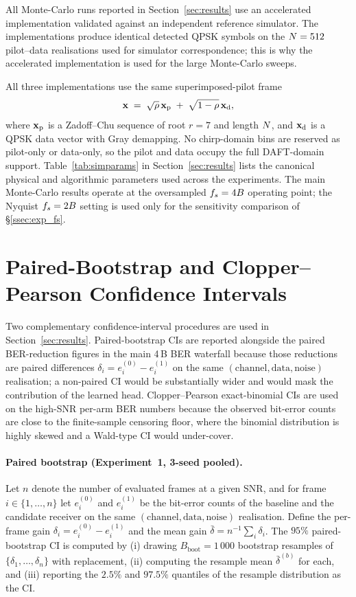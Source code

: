 All Monte-Carlo runs reported in Section~\ref{sec:results} use an
accelerated implementation validated against an independent reference
simulator. The implementations produce identical detected QPSK symbols
on the $N = 512$ pilot--data realisations used for simulator
correspondence; this is why the accelerated implementation is used for
the large Monte-Carlo sweeps.

All three implementations use the same superimposed-pilot frame
\begin{equation*}
\mathbf{x} \;=\; \sqrt{\rho}\,\mathbf{x}_{\mathrm{p}} \;+\; \sqrt{1 - \rho}\,\mathbf{x}_{\mathrm{d}},
\end{equation*}
where $\mathbf{x}_{\mathrm{p}}$ is a Zadoff--Chu sequence of root $r = 7$ and length $N$, and $\mathbf{x}_{\mathrm{d}}$ is a QPSK data vector with Gray demapping.
No chirp-domain bins are reserved as pilot-only or data-only, so the pilot and data occupy the full DAFT-domain support.
Table~\ref{tab:simparams} in Section~\ref{sec:results} lists the canonical
physical and algorithmic parameters used across the experiments. The main
Monte-Carlo results operate at the oversampled $f_s = 4B$ operating point;
the Nyquist $f_s = 2B$ setting is used only for the sensitivity comparison
of \S\ref{ssec:exp_fs}.

\section{Paired-Bootstrap and Clopper--Pearson Confidence Intervals}
\label{app:ci}

Two complementary confidence-interval procedures are used in
Section~\ref{sec:results}. Paired-bootstrap CIs are reported alongside
the paired BER-reduction figures in the main 4\,B BER waterfall because
those reductions are paired differences
$\delta_i = e^{(0)}_i - e^{(1)}_i$ on the same
$(\mathrm{channel},\mathrm{data},\mathrm{noise})$ realisation; a
non-paired CI would be substantially wider and would mask the contribution
of the learned head. Clopper--Pearson exact-binomial CIs are used on the
high-SNR per-arm BER numbers because the observed bit-error counts are
close to the finite-sample censoring floor, where the binomial
distribution is highly skewed and a Wald-type CI would under-cover.

\paragraph{Paired bootstrap (Experiment~1, 3-seed pooled).}
Let $n$ denote the number of evaluated frames at a given SNR, and for frame $i \in \{1, \dots, n\}$ let $e^{(0)}_i$ and $e^{(1)}_i$ be the bit-error counts of the baseline and the candidate receiver on the same $(\mathrm{channel}, \mathrm{data}, \mathrm{noise})$ realisation.
Define the per-frame gain $\delta_i = e^{(0)}_i - e^{(1)}_i$ and the mean gain $\bar{\delta} = n^{-1}\sum_i \delta_i$.
The $95\%$ paired-bootstrap CI is computed by (i) drawing $B_\text{boot} = 1\,000$ bootstrap resamples of $\{\delta_1, \dots, \delta_n\}$ with replacement, (ii) computing the resample mean $\bar{\delta}^{(b)}$ for each, and (iii) reporting the $2.5\%$ and $97.5\%$ quantiles of the resample distribution as the CI.

